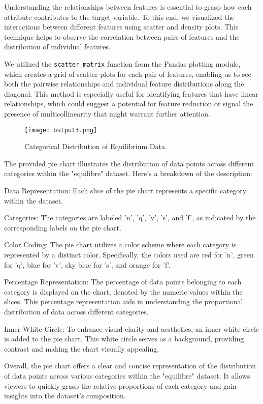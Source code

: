\documentclass{report}
\begin{document}
Understanding the relationships between features is essential to grasp how each attribute contributes to the target variable. To this end, we visualized the interactions between different features using scatter and density plots. This technique helps to observe the correlation between pairs of features and the distribution of individual features.

We utilized the \texttt{scatter\_matrix} function from the Pandas plotting module, which creates a grid of scatter plots for each pair of features, enabling us to see both the pairwise relationships and individual feature distributions along the diagonal. This method is especially useful for identifying features that have linear relationships, which could suggest a potential for feature reduction or signal the presence of multicollinearity that might warrant further attention.

\begin{figure}[ht]
    \centering
    \texttt{[image: output3.png]}
    \caption{Categorical Distribution of Equilibrium Data.}
    \label{fig:scatter_density}
\end{figure}

The provided pie chart illustrates the distribution of data points across different categories within the "equilibre" dataset. Here's a breakdown of the description:

Data Representation: Each slice of the pie chart represents a specific category within the dataset.

Categories: The categories are labeled 'n', 'q', 'v', 's', and 'f', as indicated by the corresponding labels on the pie chart.

Color Coding: The pie chart utilizes a color scheme where each category is represented by a distinct color. Specifically, the colors used are red for 'n', green for 'q', blue for 'v', sky blue for 's', and orange for 'f'.

Percentage Representation: The percentage of data points belonging to each category is displayed on the chart, denoted by the numeric values within the slices. This percentage representation aids in understanding the proportional distribution of data across different categories.

Inner White Circle: To enhance visual clarity and aesthetics, an inner white circle is added to the pie chart. This white circle serves as a background, providing contrast and making the chart visually appealing.

Overall, the pie chart offers a clear and concise representation of the distribution of data points across various categories within the "equilibre" dataset. It allows viewers to quickly grasp the relative proportions of each category and gain insights into the dataset's composition.
\end{document}
